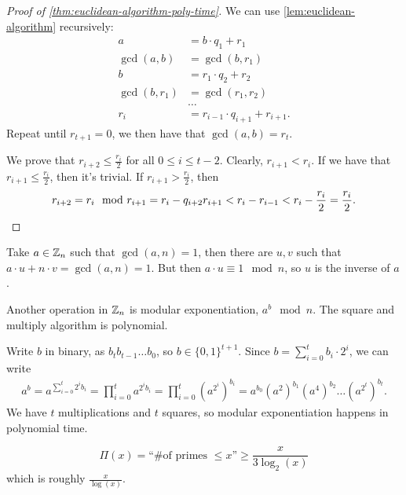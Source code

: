 \begin{proof}[Proof of \cref{thm:euclidean-algorithm-poly-time}]
	We can use \cref{lem:euclidean-algorithm} recursively:
	\begin{align*}
		a & = b \cdot q_{1} + r_{1} \tag{$0 \le r_1 < b$} \\
		\gcd(a,b) & = \gcd(b, r_1) \tag{$r_1 = a \mod b$} \\
		b & = r_{1} \cdot q_{2} + r_{2} \tag{$0 \le r_2 < r_1$} \\
		\gcd(b,r_1) & = \gcd(r_1, r_2) \tag{$r_2 = b \mod r_1$} \\
		& \dots \\
		r_{i} & = r_{i-1} \cdot q_{i+1} + r_{i+1}.
	\end{align*}
	Repeat until $r_{t+1} = 0$, we then have that $\gcd(a,b) = r_t$.

	We prove that $r_{i+2} \le \frac{r_i}{2}$ for all $0 \le i \le t-2$.
	Clearly, $r_{i+1} < r_{i}$.
	If we have that $r_{i+1} \le \frac{r_i}{2}$, then it's trivial.
	If $r_{i+1} > \frac{r_i}{2}$, then
	\begin{equation*}
		r_{i+2} = r_i \mod r_{i+1} = r_i - q_{i+2} r_{i+1}
		< r_i - r_{i-1} < r_i - \frac{r_i}{2} = \frac{r_i}{2}. \qedhere
	\end{equation*}
\end{proof}

Take $a \in \mathbb{Z}_n$ such that $\gcd(a,n) = 1$, then there are $u,v$ such that $a \cdot u + n \cdot v = \gcd(a,n) = 1$.
But then $a \cdot u \equiv 1 \mod n$, so $u$ is the inverse of $a$.

Another operation in $\mathbb{Z}_n$ is modular exponentiation, \ie $a^b \mod n$.
The square and multiply algorithm is polynomial.

Write $b$ in binary, as $b_t b_{t-1} \dots b_0$, so $b \in \{0,1\}^{t+1}$.
Since $b = \sum_{i = 0}^{t} b_i \cdot 2^i$, we can write
\begin{align*}
	a^b = a^{\sum_{i = 0}^{t} 2^i b_i} =
	\prod_{i = 0}^{t} a^{2^i b_i} =
	\prod_{i = 0}^{t} \left( a^{2^i} \right)^{b_i} =
	a^{b_0} \left( a^2 \right)^{b_1} \left( a^4 \right)^{b_2} \dots \left( a^{2^t} \right)^{b_t}.
\end{align*}
We have $t$ multiplications and $t$ squares, so modular exponentiation happens in polynomial time.

\begin{theorem} \label{thm:prime-number-theorem}
	\begin{equation*}
		\Pi(x) = \text{``\# of primes $\le x$''} \ge \frac{x}{3 \log_2(x)}
	\end{equation*}
	which is roughly $\frac{x}{\log(x)}$.
\end{theorem}

